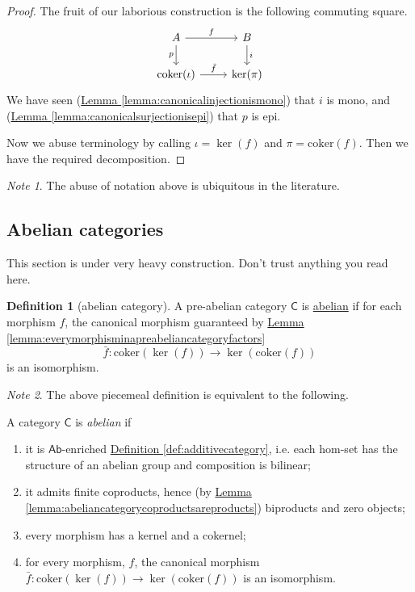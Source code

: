 \documentclass[a4paper]{report}
\newcommand{\defn}[1]{\ul{#1}}
\newcommand{\coker}{\mathrm{coker}}
\theoremstyle{definition}
\newtheorem{definition}{Definition}[section]
\theoremstyle{plain}
\theoremstyle{remark}
\newtheorem{note}{Note}[section]
\begin{document}
\begin{proof}
  The fruit of our laborious construction is the following commuting square.
  \begin{equation*}
    \begin{tikzcd}
      A
      \arrow[r, "f"]
      \arrow[d, swap, "p"]
      & B
      \arrow[d, "i"]
      \\
      \coker(\iota)
      \arrow[r, "\bar{f}"]
      & \ker(\pi)
    \end{tikzcd}
  \end{equation*}
  We have seen (\hyperref[lemma:canonicalinjectionismono]{Lemma \ref*{lemma:canonicalinjectionismono}}) that $i$ is mono, and (\hyperref[lemma:canonicalsurjectionisepi]{Lemma \ref*{lemma:canonicalsurjectionisepi}}) that $p$ is epi. 

  Now we abuse terminology by calling $\iota = \ker(f)$ and $\pi = \coker(f)$. Then we have the required decomposition.
\end{proof} 

\begin{note}
  The abuse of notation above is ubiquitous in the literature.
\end{note}

\subsection{Abelian categories}
This section is under very heavy construction. Don't trust anything you read here.
\begin{definition}[abelian category]
  \label{def:abeliancategory}
  A pre-abelian category $\mathsf{C}$ is \defn{abelian} if for each morphism $f$, the canonical morphism guaranteed by \hyperref[lemma:everymorphisminapreabeliancategoryfactors]{Lemma \ref*{lemma:everymorphisminapreabeliancategoryfactors}}
  \begin{equation*}
    \bar{f}\colon \coker(\ker(f)) \to \ker(\coker(f))
  \end{equation*}
  is an isomorphism.
\end{definition}

\begin{note}
  The above piecemeal definition is equivalent to the following.

  A category $\mathsf{C}$ is \emph{abelian} if 
  \begin{enumerate}
    \item it is $\mathsf{Ab}$-enriched \hyperref[def:additivecategory]{Definition \ref*{def:additivecategory}}, i.e. each hom-set has the structure of an abelian group and composition is bilinear;
    \item it admits finite coproducts, hence (by \hyperref[lemma:abeliancategorycoproductsareproducts]{Lemma \ref*{lemma:abeliancategorycoproductsareproducts}}) biproducts and zero objects;
    \item every morphism has a kernel and a cokernel;
    \item for every morphism, $f$, the canonical morphism $\bar{f}\colon \coker(\ker(f)) \to \ker(\coker(f))$ is an isomorphism.
  \end{enumerate}
\end{note}
\end{document}
